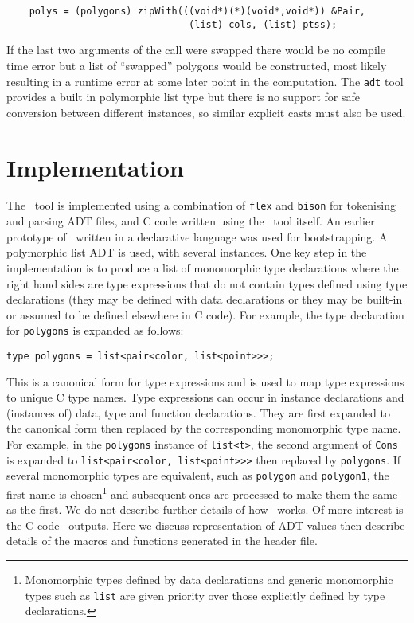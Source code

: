 \begin{verbatim}
    polys = (polygons) zipWith(((void*)(*)(void*,void*)) &Pair,
                                (list) cols, (list) ptss);
\end{verbatim}

If the last two arguments of the call were swapped
there would be no compile time error but a list of ``swapped'' polygons
would be constructed, most likely resulting in a runtime error at some
later point in the computation.  The \texttt{adt} tool provides a built
in polymorphic list type but there is no support for safe conversion
between different instances, so similar explicit casts must also be
used.

\section{Implementation}
\label{sec-imp}

The \adtpp\ tool is implemented using a combination of \texttt{flex}
and \texttt{bison}
for tokenising and parsing ADT files, and C code written using the
\adtpp\ tool itself.  An earlier prototype of \adtpp\ written in a
declarative language was used for bootstrapping.  A polymorphic list ADT
is used, with several instances.  One key step in the implementation is
to produce a list of monomorphic type declarations where the right hand
sides are type expressions that do not contain types defined using type
declarations (they may be defined with data declarations or they may be
built-in or assumed to be defined elsewhere in C code).  For example,
the type declaration for \texttt{polygons} is expanded as follows:
\begin{verbatim}
type polygons = list<pair<color, list<point>>>;
\end{verbatim}

This is a canonical form for type expressions and is used to map
type expressions to unique C type names.  Type expressions can occur
in instance declarations and (instances of) data, type and function
declarations.  They are first expanded to the
canonical form then replaced by the corresponding monomorphic type name.
For example, in the \texttt{polygons} instance of \texttt{list<t>}, the
second argument of \texttt{Cons} is expanded to \texttt{list<pair<color,
list<point>>>} then replaced by \texttt{polygons}.  If several monomorphic
types are equivalent, such as \texttt{polygon} and \texttt{polygon1},
the first name is chosen\footnote{Monomorphic types defined by data
declarations and generic monomorphic types such as \texttt{list} are
given priority over those explicitly defined by type declarations.}
and subsequent ones are processed to make them the same as the first.
We do not describe further details of how \adtpp\ works.  Of more interest
is the C code \adtpp\ outputs.  Here we discuss representation of ADT
values then describe details of the macros and functions generated in
the header file.

